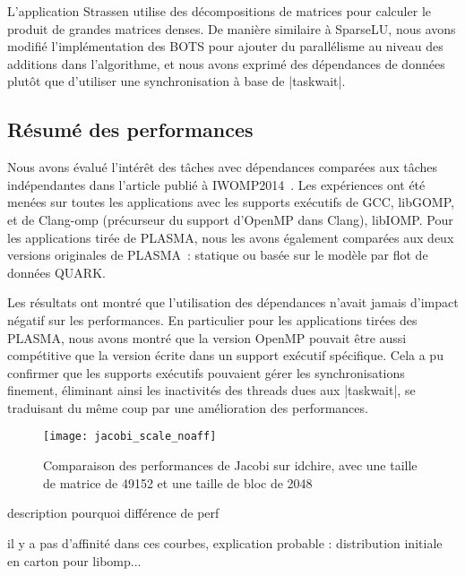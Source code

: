 L'application Strassen utilise des décompositions de matrices pour calculer le produit de grandes matrices denses.
De manière similaire à SparseLU, nous avons modifié l'implémentation des BOTS pour ajouter du parallélisme au niveau des additions dans l'algorithme, et nous avons exprimé des dépendances de données plutôt que d'utiliser une synchronisation à base de |taskwait|.

\subsection{Résumé des performances}

Nous avons évalué l'intérêt des tâches avec dépendances comparées aux tâches indépendantes dans l'article publié à IWOMP2014~\cite{Virouleau2014}.
Les expériences ont été menées sur toutes les applications avec les supports exécutifs de GCC, libGOMP, et de Clang-omp (précurseur du support d'OpenMP dans Clang), libIOMP.
Pour les applications tirée de PLASMA, nous les avons également comparées aux deux versions originales de PLASMA~: statique ou basée sur le modèle par flot de données QUARK.

Les résultats ont montré que l'utilisation des dépendances n'avait jamais d'impact négatif sur les performances.
En particulier pour les applications tirées des PLASMA, nous avons montré que la version OpenMP pouvait être aussi compétitive que la version écrite dans un support exécutif spécifique.
Cela a pu confirmer que les supports exécutifs pouvaient gérer les synchronisations finement, éliminant ainsi les inactivités des threads dues aux |taskwait|, se traduisant du même coup par une amélioration des performances.

\begin{figure}[ht]
  \centering
  \texttt{[image: jacobi\_scale\_noaff]}
  \caption{Comparaison des performances de Jacobi sur idchire, avec une taille de matrice de 49152 et une taille de bloc de 2048}\label{fig:contribs:openmp:kastors:jacobi-motiv}
\end{figure}
\begin{todo}
  description pourquoi différence de perf

  il y a pas d'affinité dans ces courbes, explication probable : distribution initiale en carton pour libomp...
\end{todo}

